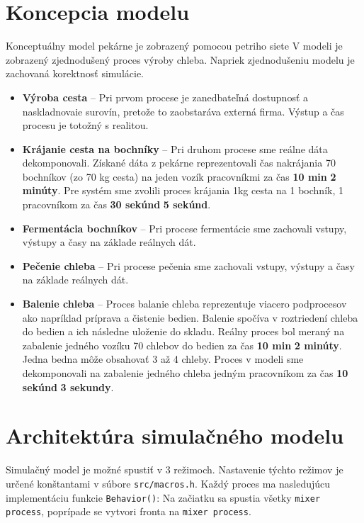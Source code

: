 \documentclass[a4paper, 10pt]{article}
\begin{document}
    \section {Koncepcia modelu}
    Konceptuálny model pekárne je zobrazený pomocou petriho siete %
    V modeli je zobrazený zjednodušený proces výroby chleba. Napriek zjednodušeniu modelu je zachovaná korektnosť simulácie.
    \begin{itemize}
        \item \textbf{Výroba cesta} -- Pri prvom procese je zanedbateľná dostupnosť a naskladnovaie surovín,
        pretože to zaobstaráva externá firma. Výstup a čas procesu je totožný s realitou.

        \item \textbf{Krájanie cesta na bochníky} -- Pri druhom procese sme reálne dáta dekomponovali. Získané
        dáta z pekárne reprezentovali čas nakrájania 70 bochníkov (zo 70 kg cesta) na jeden vozík pracovníkmi za čas \textbf{10 min} \textpm \textbf{ 2 minúty}.
        Pre systém sme zvolili proces krájania 1kg cesta na 1 bochník, 1 pracovníkom za čas \textbf{30 sekúnd} \textpm \textbf{ 5 sekúnd}.

        \item \textbf{Fermentácia bochníkov} -- Pri procese fermentácie sme zachovali vstupy, výstupy a časy na základe reálnych dát.

        \item \textbf{Pečenie chleba} -- Pri procese pečenia sme zachovali vstupy, výstupy a časy na základe reálnych dát.

        \item \textbf{Balenie chleba} -- Proces balanie chleba reprezentuje viacero podprocesov ako napríklad príprava a čistenie bedien.
        Balenie spočíva v roztriedení chleba do bedien a ich následne uloženie do skladu. Reálny proces bol meraný na
        zabalenie jedného vozíku 70 chlebov do bedien za čas \textbf{10 min} \textpm \textbf{ 2 minúty}. Jedna bedna môže obsahovať 3 až 4 chleby. Proces v modeli sme dekomponovali
        na zabalenie jedného chleba jedným pracovníkom za čas \textbf{10 sekúnd} \textpm \textbf{ 3 sekundy}.
    \end{itemize}

    \section{Architektúra simulačného modelu}
    Simulačný model\cite[slide 44]{IMS_slides} je možné spustiť v 3 režimoch. Nastavenie týchto
    režimov je určené konštantami v súbore \texttt{src/macros.h}.
    Každý proces ma nasledujúcu implementáciu funkcie \texttt{Behavior()}:
    Na začiatku sa spustia všetky \texttt{mixer process}, poprípade se vytvori fronta na \texttt{mixer process}.
\end{document}
